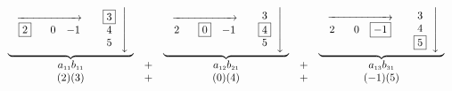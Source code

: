 \[ \begin{array}{ccccc}

\underbrace{\begin{array}{rl} \stackrel{\xrightarrow{\hspace{.75in}}}{\begin{array}{ccc} \fbox{2} &  \hphantom{-}0 & -1 \end{array}} & \left. \begin{array}{c} \fbox{3}  \\ 4   \\ 5  \\ \end{array} \right\downarrow \\ \end{array}}

&

&

\underbrace{\begin{array}{rl} \stackrel{\xrightarrow{\hspace{.75in}}}{\begin{array}{ccc} 2 & \hphantom{-}\fbox{0} & -1 \end{array}} &  \left.  \begin{array}{c} 3 \\ \fbox{4}    \\ 5  \\ \end{array} \right\downarrow \\\end{array}}

& 


&


\underbrace{\begin{array}{rl} \stackrel{\xrightarrow{\hspace{.75in}}}{\begin{array}{ccc} 2 & \hphantom{-}0 & \fbox{$-1$} \end{array}} &  \left. \begin{array}{c} 3 \\ 4 \\ \fbox{5}   \\ \end{array} \right\downarrow \\ \end{array}}  \\

a_{\mbox{\tiny$11$}}b_{\mbox{\tiny$11$}} & + & a_{\mbox{\tiny$12$}}b_{\mbox{\tiny$21$}} & + & a_{\mbox{\tiny$13$}}b_{\mbox{\tiny$31$}}  \\

(2)(3) & + &(0)(4)& + & (-1)(5)  \\

\end{array}\]



